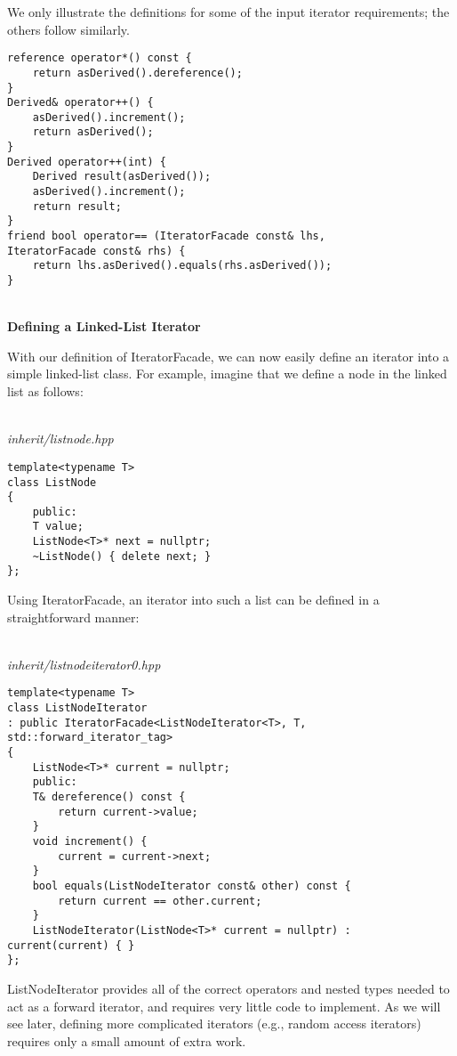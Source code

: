 We only illustrate the definitions for some of the input iterator requirements; the others follow similarly.

\begin{lstlisting}[style=styleCXX]
reference operator*() const {
	return asDerived().dereference();
}
Derived& operator++() {
	asDerived().increment();
	return asDerived();
}
Derived operator++(int) {
	Derived result(asDerived());
	asDerived().increment();
	return result;
}
friend bool operator== (IteratorFacade const& lhs,
IteratorFacade const& rhs) {
	return lhs.asDerived().equals(rhs.asDerived());
}
\end{lstlisting}

\hspace*{\fill} \\ %
\noindent
\textbf{Defining a Linked-List Iterator}

With our definition of IteratorFacade, we can now easily define an iterator into a simple linked-list class. For example, imagine that we define a node in the linked list as follows:

\hspace*{\fill} \\ %
\noindent
\textit{inherit/listnode.hpp}
\begin{lstlisting}[style=styleCXX]
template<typename T>
class ListNode
{
	public:
	T value;
	ListNode<T>* next = nullptr;
	~ListNode() { delete next; }
};
\end{lstlisting}

Using IteratorFacade, an iterator into such a list can be defined in a straightforward manner:

\hspace*{\fill} \\ %
\noindent
\textit{inherit/listnodeiterator0.hpp}
\begin{lstlisting}[style=styleCXX]
template<typename T>
class ListNodeIterator
: public IteratorFacade<ListNodeIterator<T>, T,
std::forward_iterator_tag>
{
	ListNode<T>* current = nullptr;
	public:
	T& dereference() const {
		return current->value;
	}
	void increment() {
		current = current->next;
	}
	bool equals(ListNodeIterator const& other) const {
		return current == other.current;
	}
	ListNodeIterator(ListNode<T>* current = nullptr) : current(current) { }
};
\end{lstlisting}

ListNodeIterator provides all of the correct operators and nested types needed to act as a forward iterator, and requires very little code to implement. As we will see later, defining more complicated iterators (e.g., random access iterators) requires only a small amount of extra work.

